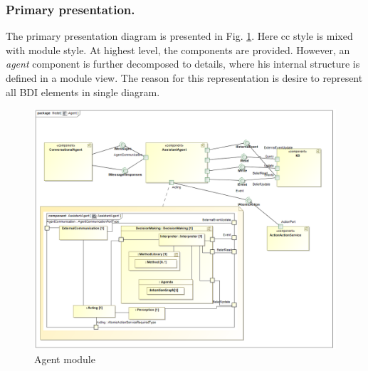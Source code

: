 \documentclass{llncs}
\begin{document}
\subsubsection{Primary presentation.}
The primary presentation diagram is presented in Fig. \ref{fig:agent}. Here \gls{cc} style is mixed with module style. At highest level, the components are provided. However, an \emph{agent} component is further decomposed to details, where his internal structure is defined in a module view. The reason for this representation is desire to represent all \gls{BDI} elements in single diagram.
\begin{figure}[t]
	\centering
	\includegraphics[width=\linewidth]{Images/agent.png}
	\caption{Agent module}	
	\label{fig:agent}
\end{figure}
\end{document}
